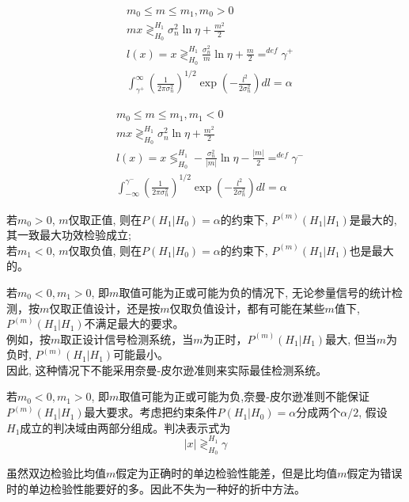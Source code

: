 \begin{frame}
\begin{align*}
&m_0\le m\le m_1,m_0>0\\
&mx\mathop{\gtrless}_{H_0}^{H_1}\sigma_n^2\ln\eta+\frac{m^2}{2}\\
&l(x)=x\mathop{\gtrless}_{H_0}^{H_1}\frac{\sigma_n^2}{m}\ln\eta+\frac{m}{2}\mathop{=}^{def}\gamma^+\\
&\int_{\gamma^+}^{\infty}(\frac{1}{2\pi\sigma_n^2})^{1/2}\exp(-\frac{l^2}{2\sigma_n^2})dl=\alpha
\end{align*}
\end{frame}

\begin{frame}
\begin{align*}
&m_0\le m\le m_1,m_1<0\\
&mx\mathop{\gtrless}_{H_0}^{H_1}\sigma_n^2\ln\eta+\frac{m^2}{2}\\
&l(x)=x\mathop{\lessgtr}_{H_0}^{H_1}-\frac{\sigma_n^2}{|m|}\ln\eta-\frac{|m|}{2}\mathop{=}^{def}\gamma^-\\
&\int_{-\infty}^{\gamma^-}(\frac{1}{2\pi\sigma_n^2})^{1/2}\exp(-\frac{l^2}{2\sigma_n^2})dl=\alpha
\end{align*}
\end{frame}

\begin{frame}
若$m_0>0$, $m$仅取正值, 则在$P(H_1|H_0)=\alpha$的约束下, $P^{(m)}(H_1|H_1)$是最大的,其一致最大功效检验成立;\\
若$m_1<0$, $m$仅取负值, 则在$P(H_1|H_0)=\alpha$的约束下, $P^{(m)}(H_1|H_1)$也是最大的。
\end{frame}

\begin{frame}
若$m_0<0,m_1>0$, 即$m$取值可能为正或可能为负的情况下, 无论参量信号的统计检测，按$m$仅取正值设计，还是按$m$仅取负值设计，都有可能在某些$m$值下,   $P^{(m)}(H_1|H_1)$不满足最大的要求。\\
例如，按$m$取正设计信号检测系统，当$m$为正时，$P^{(m)}(H_1|H_1)$最大, 但当$m$为负时, $P^{(m)}(H_1|H_1)$可能最小。\\
因此, 这种情况下不能采用奈曼-皮尔逊准则来实际最佳检测系统。
\end{frame}

\begin{frame}
若$m_0<0,m_1>0$, 即$m$取值可能为正或可能为负,奈曼-皮尔逊准则不能保证$P^{(m)}(H_1|H_1)$最大要求。考虑把约束条件$P(H_1|H_0)=\alpha$分成两个$\alpha/2$, 假设$H_1成立$的判决域由两部分组成。判决表示式为
	\[|x|\mathop{\gtrless}_{H_0}^{H_1}\gamma \]

\begin{block}{}
	虽然双边检验比均值$m$假定为正确时的单边检验性能差，但是比均值$m$假定为错误时的单边检验性能要好的多。因此不失为一种好的折中方法。
\end{block}
\end{frame}

